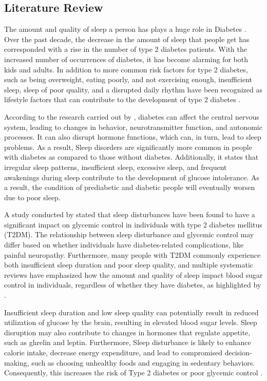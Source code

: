 \subsection*{Literature Review}
The amount and quality of sleep a person has plays a huge role in Diabetes
\parencite{khandelwal-2017}. Over the past decade, the decrease in the amount of
sleep that people get has corresponded with a rise in the number of type 2
diabetes patients. With the increased number of occurrences of diabetes, it has
become alarming for both kids and adults. In addition to more common risk
factors for type 2 diabetes, such as being overweight, eating poorly, and not
exercising enough,  insufficient sleep, sleep of poor quality, and a disrupted
daily rhythm have been recognized as lifestyle factors that can contribute to
the development of type 2 diabetes \parencite{sondrup-2022}.

According to the research carried out by \textcite{van-cauter-2021}, diabetes
can affect the central nervous system, leading to changes in behavior,
neurotransmitter function, and autonomic processes. It can also disrupt hormone
functions, which can, in turn, lead to sleep problems. As a result, Sleep
disorders are significantly more common in people with diabetes as compared to
those without diabetes. Additionally, it states that irregular sleep patterns,
insufficient sleep, excessive sleep, and frequent awakenings during sleep
contribute to the development of glucose intolerance. As a result, the condition
of prediabetic and diabetic people will eventually worsen due to poor sleep.

A study conducted by \textcite{zhu-2017} stated that sleep disturbances have been
found to have a significant impact on glycemic control in individuals with type
2 diabetes mellitus (T2DM). The relationship between sleep disturbance and
glycemic control may differ based on whether individuals have diabetes-related
complications, like painful neuropathy. Furthermore, many people with T2DM
commonly experience both insufficient sleep duration and poor sleep quality, and
multiple systematic reviews have emphasized how the amount and quality of sleep
impact blood sugar control in individuals, regardless of whether they have
diabetes, as highlighted by \textcite{smyth-2020}.


Insufficient sleep duration and low sleep quality can potentially result in
reduced utilization of glucose by the brain, resulting in elevated blood sugar
levels. Sleep disruption may also contribute to changes in hormones that
regulate appetite, such as ghrelin and leptin. Furthermore, Sleep disturbance is
likely to enhance calorie intake, decrease energy expenditure, and lead to
compromised decision-making, such as choosing unhealthy foods and engaging in
sedentary behaviors. Consequently, this increases the risk of Type 2 diabetes or
poor glycemic control \textcite{zhu-2017}.

